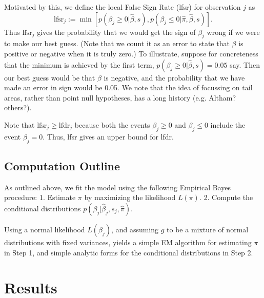 \documentclass[10pt]{article}
\def\lfsr{\text{lfsr}}
\begin{document}
Motivated by this, we define the local False Sign Rate (lfsr) for observation $j$ as 
\begin{equation}
\lfsr_j := \min[ p(\beta_j \geq 0| \hat\beta, s), p(\beta_j \leq 0| \hat\pi, \hat\beta, s) ].
\end{equation}
Thus $\lfsr_j$ gives the probability that we would get the sign of $\beta_j$ wrong if we
were to make our best guess. (Note that we count it as an error to state that $\beta$ is positive or negative when it is truly zero.)
To illustrate, suppose for concreteness
that the minimum is achieved by the first term, $p(\beta_j \geq 0| \hat\beta, s)=0.05$ say. Then
our best guess would be that $\beta$ is negative, and the probability that we have
made an error in sign would be 0.05. We note that the idea of focussing on tail areas, rather than point null hypotheses,
has a long history (e.g. Altham? others?).

Note that $\text{lfsr}_j \geq \text{lfdr}_j$ 
because both the events $\beta_j \geq 0$
and $\beta_j \leq 0$ include the event $\beta_j=0$.
Thus, lfsr gives an upper bound for lfdr.






\subsection{Computation Outline}

As outlined above, we fit the model using the following Empirical Bayes procedure:
1. Estimate $\pi$ by maximizing the likelihood $L(\pi)$.
2. Compute the conditional distributions $p(\beta_j | \hat\beta_j, s_j, \hat\pi)$.

Using a normal likelihood $L(\beta_j)$, and assuming
$g$ to be a mixture of normal distributions with fixed variances, 
yields a simple EM algorithm
for estimating $\pi$ in Step 1, and simple analytic forms for the conditional
distributions in Step 2.


\section*{Results}
\end{document}
